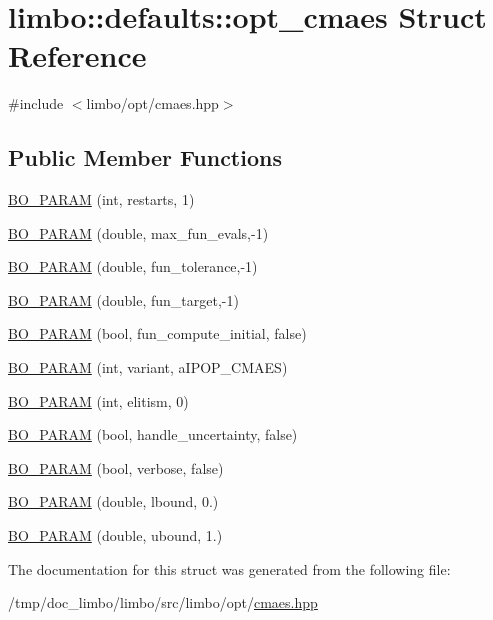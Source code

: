 \hypertarget{structlimbo_1_1defaults_1_1opt__cmaes}{}\section{limbo\+:\+:defaults\+:\+:opt\+\_\+cmaes Struct Reference}
\label{structlimbo_1_1defaults_1_1opt__cmaes}


{\ttfamily \#include $<$limbo/opt/cmaes.\+hpp$>$}

\subsection*{Public Member Functions}
\begin{DoxyCompactItemize}
\item 
\hyperlink{group__opt__defaults_gaba7127b5e591a72095bd6c3a4155828d}{B\+O\+\_\+\+P\+A\+R\+A\+M} (int, restarts, 1)
\item 
\hyperlink{group__opt__defaults_ga5130bd236acff913c59380059474ebab}{B\+O\+\_\+\+P\+A\+R\+A\+M} (double, max\+\_\+fun\+\_\+evals,-\/1)
\item 
\hyperlink{group__opt__defaults_ga5f980ba02cafe6ee52d6b9cd485e3d05}{B\+O\+\_\+\+P\+A\+R\+A\+M} (double, fun\+\_\+tolerance,-\/1)
\item 
\hyperlink{group__opt__defaults_ga1b4276da9161bb04b84b4cd9307a37ab}{B\+O\+\_\+\+P\+A\+R\+A\+M} (double, fun\+\_\+target,-\/1)
\item 
\hyperlink{group__opt__defaults_ga14aff955e1360233e5ac361bdd2f3118}{B\+O\+\_\+\+P\+A\+R\+A\+M} (bool, fun\+\_\+compute\+\_\+initial, false)
\item 
\hyperlink{group__opt__defaults_gaf6fe5f409527ed056cee8cf8df52da9e}{B\+O\+\_\+\+P\+A\+R\+A\+M} (int, variant, a\+I\+P\+O\+P\+\_\+\+C\+M\+A\+E\+S)
\item 
\hyperlink{group__opt__defaults_ga660850db2d1f35863416f9790fe5125e}{B\+O\+\_\+\+P\+A\+R\+A\+M} (int, elitism, 0)
\item 
\hyperlink{group__opt__defaults_gad4f97065dd716df6c84e093059ab39f6}{B\+O\+\_\+\+P\+A\+R\+A\+M} (bool, handle\+\_\+uncertainty, false)
\item 
\hyperlink{group__opt__defaults_gae78e735b53742e438847fb63817f2ed1}{B\+O\+\_\+\+P\+A\+R\+A\+M} (bool, verbose, false)
\item 
\hyperlink{group__opt__defaults_ga0af64a0a2ea5ba01473e0cf284154dea}{B\+O\+\_\+\+P\+A\+R\+A\+M} (double, lbound, 0.)
\item 
\hyperlink{group__opt__defaults_ga4d61ad0b07412ab14a72c008a8f99455}{B\+O\+\_\+\+P\+A\+R\+A\+M} (double, ubound, 1.)
\end{DoxyCompactItemize}


The documentation for this struct was generated from the following file\+:\begin{DoxyCompactItemize}
\item 
/tmp/doc\+\_\+limbo/limbo/src/limbo/opt/\hyperlink{cmaes_8hpp}{cmaes.\+hpp}\end{DoxyCompactItemize}
